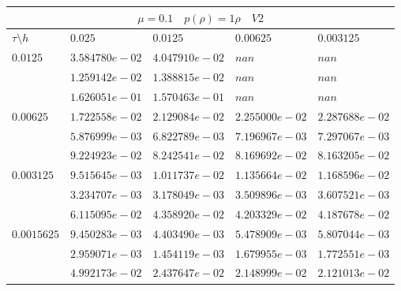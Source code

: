 \documentclass[a4paper,12pt]{extarticle}
\begin{document}
\begin{tabular}{|l|l|l|l|l|}
	\hline
	\multicolumn{5}{|c|}{$\mu =0.1 \quad  p(\rho) =1 \rho \quad V2$}\\
	\hline
	$\tau\setminus h$ & $0.025$ & $0.0125$ & $0.00625$ & $0.003125$\\
	\hline
	$0.0125$  & $3.584780e-02$ & $4.047910e-02$ & $nan$ & $nan$\\
	& $1.259142e-02$ & $1.388815e-02$ & $nan$ & $nan$\\
	& $1.626051e-01$ & $1.570463e-01$ & $nan$ & $nan$\\
	\hline
	$0.00625$  & $1.722558e-02$ & $2.129084e-02$ & $2.255000e-02$ & $2.287688e-02$\\
	& $5.876999e-03$ & $6.822789e-03$ & $7.196967e-03$ & $7.297067e-03$\\
	& $9.224923e-02$ & $8.242541e-02$ & $8.169692e-02$ & $8.163205e-02$\\
	\hline
	$0.003125$  & $9.515645e-03$ & $1.011737e-02$ & $1.135664e-02$ & $1.168596e-02$\\
	& $3.234707e-03$ & $3.178049e-03$ & $3.509896e-03$ & $3.607521e-03$\\
	& $6.115095e-02$ & $4.358920e-02$ & $4.203329e-02$ & $4.187678e-02$\\
	\hline
	$0.0015625$  & $9.450283e-03$ & $4.403490e-03$ & $5.478909e-03$ & $5.807044e-03$\\
	& $2.959071e-03$ & $1.454119e-03$ & $1.679955e-03$ & $1.772551e-03$\\
	& $4.992173e-02$ & $2.437647e-02$ & $2.148999e-02$ & $2.121013e-02$\\
	\hline
\end{tabular}
\end{document}
